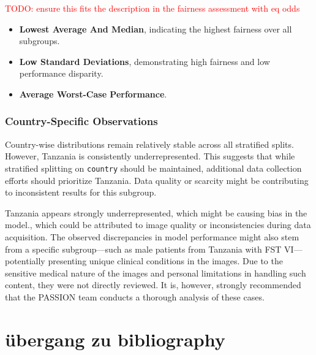 \documentclass[12pt, a4paper, oneside]{book}   	%
\renewcommand{\todo}[1]{\textcolor{red}{TODO: #1}}
\begin{document}
			
			
			
			\todo{ensure this fits the description in the fairness assessment with eq odds}
		\begin{itemize}
			\item \textbf{Lowest Average And Median}, indicating the highest fairness over all subgroups.
			\item \textbf{Low Standard Deviations}, demonstrating high fairness and low performance disparity.
			\item \textbf{Average Worst-Case Performance}.
		\end{itemize}
			
		\subsection{Country-Specific Observations}
			
			Country-wise distributions remain relatively stable across all stratified splits. However, Tanzania is consistently underrepresented. This suggests that while stratified splitting on \texttt{country} should be maintained, additional data collection efforts should prioritize Tanzania. Data quality or scarcity might be contributing to inconsistent results for this subgroup.


			Tanzania appears strongly underrepresented, which might be causing bias in the model., which could be attributed to image quality or inconsistencies during data acquisition. The observed discrepancies in model performance might also stem from a specific subgroup—such as male patients from Tanzania with \gls{FST} VI—potentially presenting unique clinical conditions in the images. Due to the sensitive medical nature of the images and personal limitations in handling such content, they were not directly reviewed. It is, however, strongly recommended that the PASSION team conducts a thorough analysis of these cases.
			
			
	
			
	\chapter{übergang zu bibliography}

		\newpage
\end{document}
